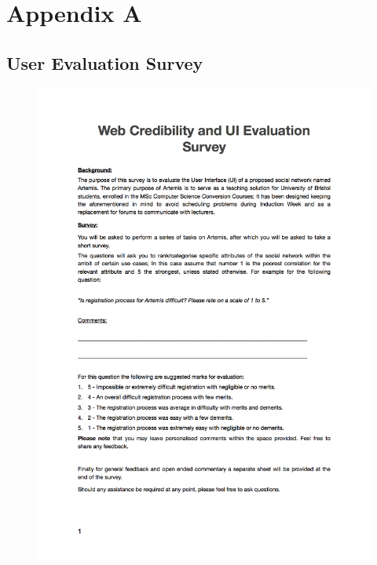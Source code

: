 %
%

\chapter{Appendix A}
\label{app:app01}

\section{User Evaluation Survey}

\begin{figure}[H]
	\centering
	\includegraphics[scale=.60]{chapters/appendices/figures/1.png}
	\label{fig:1/6}
\end{figure}
\newpage

